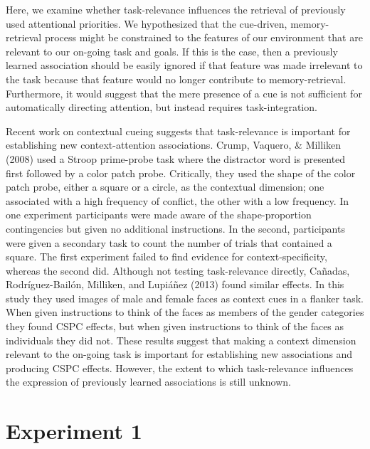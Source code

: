 \documentclass[english,,man,floatsintext]{apa6}
\begin{document}
Here, we examine whether task-relevance influences the retrieval of previously used attentional priorities. We hypothesized that the cue-driven, memory-retrieval process might be constrained to the features of our environment that are relevant to our on-going task and goals. If this is the case, then a previously learned association should be easily ignored if that feature was made irrelevant to the task because that feature would no longer contribute to memory-retrieval. Furthermore, it would suggest that the mere presence of a cue is not sufficient for automatically directing attention, but instead requires task-integration.

Recent work on contextual cueing suggests that task-relevance is important for establishing new context-attention associations. Crump, Vaquero, \& Milliken (2008) used a Stroop prime-probe task where the distractor word is presented first followed by a color patch probe. Critically, they used the shape of the color patch probe, either a square or a circle, as the contextual dimension; one associated with a high frequency of conflict, the other with a low frequency. In one experiment participants were made aware of the shape-proportion contingencies but given no additional instructions. In the second, participants were given a secondary task to count the number of trials that contained a square. The first experiment failed to find evidence for context-specificity, whereas the second did. Although not testing task-relevance directly, Cañadas, Rodríguez-Bailón, Milliken, and Lupiáñez (2013) found similar effects. In this study they used images of male and female faces as context cues in a flanker task. When given instructions to think of the faces as members of the gender categories they found CSPC effects, but when given instructions to think of the faces as individuals they did not. These results suggest that making a context dimension relevant to the on-going task is important for establishing new associations and producing CSPC effects. However, the extent to which task-relevance influences the expression of previously learned associations is still unknown.

\hypertarget{experiment-1}{%
\section{Experiment 1}\label{experiment-1}}
\end{document}
